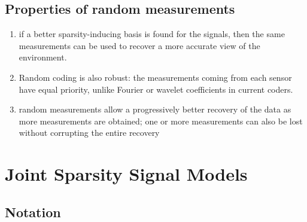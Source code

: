 \documentclass[UTF8]{ctexart}
\theoremstyle{plain}
\theoremstyle{definition}
\theoremstyle{remark}
\begin{document}
\subsection{Properties of random measurements}

\begin{enumerate}
	\item if a better sparsity-inducing basis is found for the signals, then the same measurements can be used to recover a more accurate view of the environment.
	\item Random coding is also robust: the measurements coming from each sensor have equal priority, unlike Fourier or wavelet coefficients in current coders.
	\item  random measurements allow a progressively better recovery of the data as more measurements are obtained; one or more measurements can also be lost without corrupting the entire recovery
\end{enumerate}

\section{Joint Sparsity Signal Models}
		
	\subsection{Notation}
		
\end{document}
